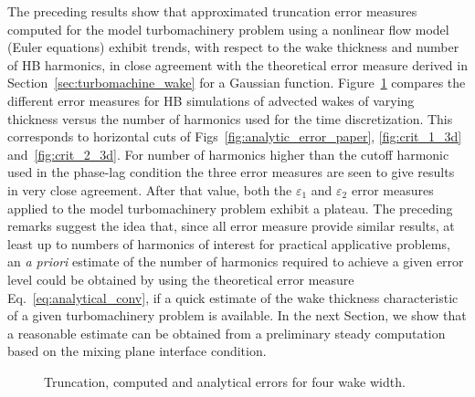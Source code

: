 The preceding results show that approximated truncation error 
measures computed for the model turbomachinery problem 
using a nonlinear flow model (Euler equations) 
exhibit trends, with respect to the wake thickness 
and number of HB harmonics, in close agreement with the 
theoretical error measure derived in Section~\ref{sec:turbomachine_wake} 
for a Gaussian function. 
Figure~\ref{fig:error_comp_curves} compares the 
different error measures for HB simulations of 
advected wakes of varying thickness versus 
the number of harmonics used for the time discretization. 
This corresponds to horizontal cuts of Figs~\ref{fig:analytic_error_paper}, 
\ref{fig:crit_1_3d} and~\ref{fig:crit_2_3d}. 
For number of harmonics higher than the cutoff 
harmonic used in the phase-lag condition 
the three error measures are seen to give 
results in very close agreement. After that value, 
both the $\varepsilon_1$ and $\varepsilon_2$ error 
measures applied to the model turbomachinery problem 
exhibit a plateau.
The preceding remarks suggest the idea that, 
since all error measure provide similar results, 
at least up to numbers of harmonics of interest for 
practical applicative problems, an \emph{a priori} 
estimate of the number of harmonics required 
to achieve a given error level could be 
obtained by using the theoretical error measure 
Eq.~\eqref{eq:analytical_conv}, if a quick 
estimate of the wake thickness characteristic 
of a given turbomachinery problem is available. 
In the next Section, we show that a reasonable 
estimate can be obtained from a preliminary steady 
computation based on the mixing plane interface condition.
\begin{figure}[htp]
  \centering
  \quad
  \quad
  \quad
  \quad
  \caption{Truncation, computed and analytical errors for four wake width.}
  \label{fig:error_comp_curves}
\end{figure}

